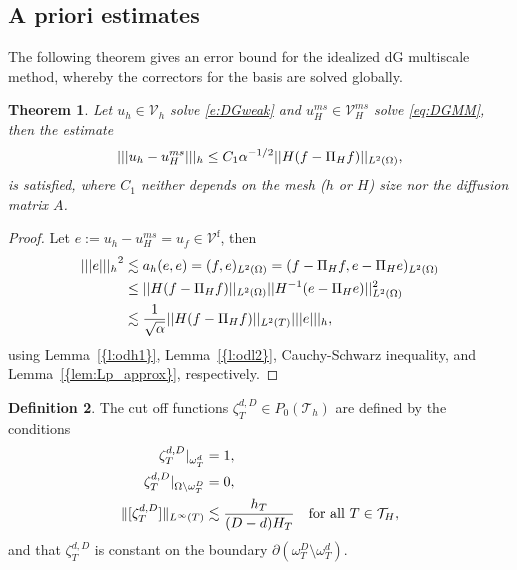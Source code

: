 \documentclass[10pt]{article}
\numberwithin{equation}{section}
\theoremstyle{plain}
\newtheorem{theorem}{Theorem}
\theoremstyle{definition}
\newtheorem{definition}[theorem]{Definition}
\theoremstyle{remark}
\begin{document}
\subsection{A priori estimates}\label{Mdiscretization}
The following theorem gives an error bound for the idealized dG multiscale method, whereby the correctors for the basis are solved globally.
\begin{theorem}\label{thm:umshH}
  Let $u_h\in{\mathcal{V}_h}$ solve \eqref{e:DGweak} and ${u^{ms}_{H}}\in{\mathcal{V}^{ms}_{H}}$ solve \eqref{eq:DGMM}, then the estimate
  \begin{equation}\notag
    {||| {u_h-{u^{ms}_{H}}} |||_h} \leq C_1{\alpha}^{-1/2}|| H(f-{\Pi_H} f ) ||_{L^2(\Omega)},
  \end{equation}
  is satisfied, where $C_1$ neither depends on the mesh ($h$ or $H$) size nor the diffusion matrix ${A}$.
\end{theorem}
\begin{proof}
  Let $e := u_h-{u^{ms}_{H}}=u_f\in {\mathcal{V}^{\operatorname*{f}}}$, then
  \begin{equation}\notag
    \begin{aligned}
    {||| {e} |||_h}^2 &\lesssim {a_h({e},{e})}= (f,e)_{L^2(\Omega)} = (f-{\Pi_H} f,e-{\Pi_H} e)_{L^2(\Omega)} \\
    & \leq ||H(f-{\Pi_H} f)||_{L^2(\Omega)}||H^{-1}(e-{\Pi_H} e)||^2_{L^2(\Omega)}\\
    & \lesssim \frac{1}{\sqrt{\alpha}}||H (f-{\Pi_H} f)||_{L^2(T)}{||| {e} |||_h},
    \end{aligned}
  \end{equation}
  using {Lemma~\ref{{l:odh1}}}, {Lemma~\ref{{l:odl2}}}, Cauchy-Schwarz inequality, and {Lemma~\ref{{lem:Lp_approx}}}, respectively.
\end{proof}

\begin{definition}
  The cut off functions $\zeta_T^{d,D}\in P_0({\mathcal{T}}_h)$ are defined by the conditions
  \begin{equation}\notag
    \begin{aligned}
      \zeta_T^{d,D}|_{\omega_T^d} &= 1, \\
      \zeta_T^{d,D}|_{\Omega\setminus\omega^D_T} &= 0, \\
      \|[\zeta_T^{d,D}]\|_{L^\infty(T)}& \lesssim \frac{h_T}{(D-d)H_T}\quad\text{for all }T\in{\mathcal{T}}_H,
    \end{aligned}
  \end{equation}
  and that $\zeta_T^{d,D}$ is constant on the boundary $\partial(\omega^D_T\setminus\omega^d_T)$.
\end{definition}
\end{document}
